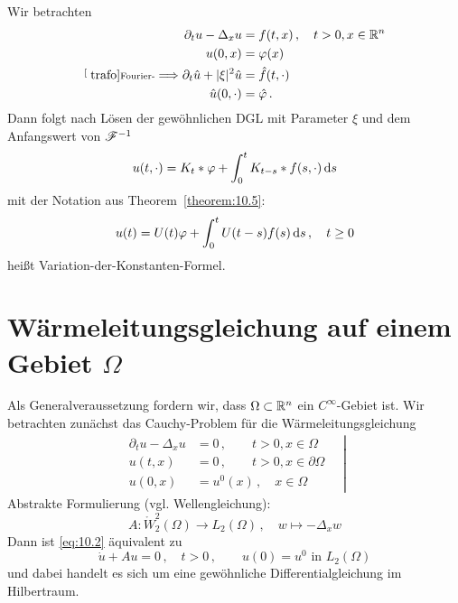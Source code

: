 \begin{bem}
\label{bem:10.7}
Wir betrachten 
\begin{align*}
	\partial_t u - \Delta_x u & = f(t,x) \, , \quad t > 0, x \in \mathbb{R}^n \\
	u(0,x) & = \varphi (x) \\
	\stackrel[\scriptsize\text{trafo}]{\scriptsize\text{Fourier-}}\Longrightarrow \partial_t \hat u + \lvert \xi\rvert^2 \hat u & = \hat f(t,\cdot) \\
	\hat u(0,\cdot) & = \hat \varphi \, .
\end{align*}
Dann folgt nach Lösen der gewöhnlichen DGL mit Parameter $\xi$ und dem Anfangswert von $\mathscr{F}^{-1}$
\[
	u(t,\cdot) = K_t \ast \varphi +\int_0^t K_{t-s} \ast f(s,\cdot) \,\mathrm{d} s
\]
mit der Notation aus Theorem~\ref{theorem:10.5}:
\[
	u(t) = U(t) \varphi + \int_0^t U(t-s) f(s) \,\mathrm{d} s \, , \quad t \geq 0
\]
heißt Variation-der-Konstanten-Formel.
\end{bem}

\section{Wärmeleitungsgleichung auf einem Gebiet $\Omega$}

Als Generalveraussetzung fordern wir, dass $\Omega\subset \mathbb{R}^n$ ein $C^\infty$-Gebiet ist.
Wir betrachten zunächst das Cauchy-Problem für die Wärmeleitungsgleichung
\begin{align}
\label{eq:10.2}\left.
\begin{aligned}
	\partial_t u -\Delta_x u & = 0 \, , \qquad t > 0 , x \in \Omega \\
	u(t,x) &= 0 \, , \qquad t > 0, x \in \partial \Omega \\
	u(0,x) & = u^0 (x) \, , \quad x \in \Omega
\end{aligned}
\quad \right|
\end{align}
Abstrakte Formulierung (vgl. Wellengleichung):
\[
	A : \mathring W^2_2(\Omega) \longrightarrow L_2(\Omega) \, , \quad w \mapsto -\Delta_x w
\]
Dann ist \eqref{eq:10.2} äquivalent zu
\[
	\dot u + Au = 0 \, , \quad t > 0\, , \qquad u (0 ) = u^0 \text{ in } L_2(\Omega)
\]
und dabei handelt es sich um eine gewöhnliche Differentialgleichung im Hilbertraum.

